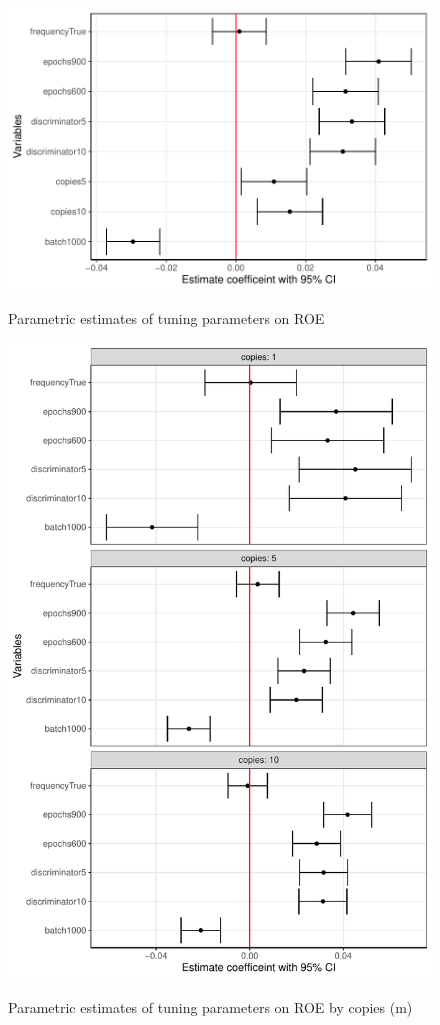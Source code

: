 \documentclass[12pt]{article}
\begin{document}
\begin{figure}[!h]
    \centering
    \caption{Parametric estimates of tuning parameters on ROE}
    \includegraphics{../graphs/ctgan/graph_ctgan_roc_univar.pdf}
    \label{graph_ctgan_roc_univar}
\end{figure}

\begin{figure}[!h]
    \centering
    \caption{Parametric estimates of tuning parameters on ROE by copies (m)}
    \includegraphics{../graphs/ctgan/graph_ctgan_roc_univar_facet.pdf}
    \label{graph_ctgan_roc_univar_facet}
\end{figure}
\end{document}
